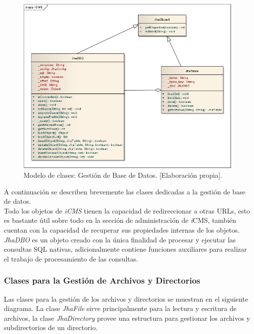 \begin{figure}[h]
\centering
\includegraphics[scale=.5, keepaspectratio=true]{imagenes/06_imagen.png}
\caption{Modelo de clases: Gesti\'on de Base de Datos. [Elaboraci\'on propia].}
\end{figure}

A continuaci\'on se describen brevemente las clases dedicadas a la gesti\'on de base de datos.\\

Todo los objetos de \textit{iCMS} tienen la capacidad de redireccionar a otras URLs, esto es bastante \'util sobre todo en la secci\'on de administraci\'on de \textit{i}CMS, tambi\'en cuentan con la capacidad de recuperar sus propiedades internas de los objetos.\\



\emph{JhaDBO} es un objeto creado con la \'unica finalidad de procesar y ejecutar las consultas SQL nativas, adicionalmente contiene funciones auxiliares para realizar el trabajo de procesamiento de las consultas.



\subsubsection{Clases para la Gesti\'on de Archivos y Directorios}
Las clases para la gesti\'on de los archivos y directorios se muestran en el siguiente diagrama. La clase \textit{JhaFile} sirve principalmente para la lectura y escritura de archivos, la clase \textit{JhaDirectory} provee una estructura para gestionar los archivos y subdirectorios de un directorio.\\

